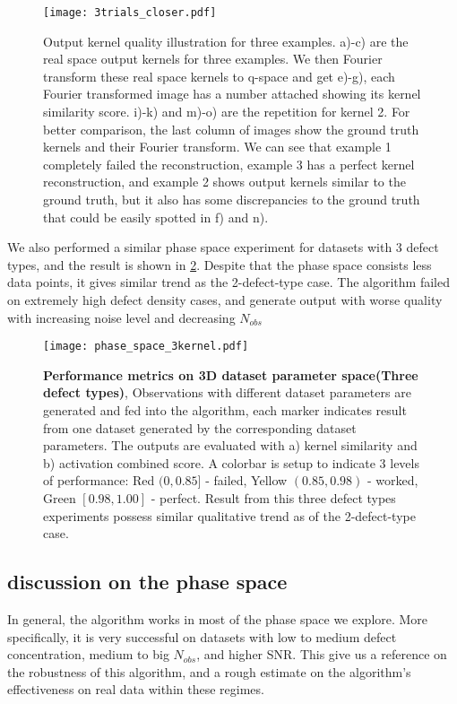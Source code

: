 \begin{figure}
	\texttt{[image: 3trials\_closer.pdf]} 
	\centering
	\caption{Output kernel quality illustration for three examples. a)-c) are the real space output kernels for three examples. We then Fourier transform these real space kernels to q-space and get e)-g), each Fourier transformed image has a number attached showing its kernel similarity score. i)-k) and m)-o) are the repetition for kernel 2. For better comparison, the last column of images show the ground truth kernels and their Fourier transform. We can see that example 1 completely failed the reconstruction, example 3 has a perfect kernel reconstruction, and example 2 shows output kernels similar to the ground truth, but it also has some discrepancies to the ground truth that could be easily spotted in f) and n).}
	\label{fig:regimes_closer}
\end{figure}

We also performed a similar phase space experiment for datasets with 3 defect types, and the result is shown in \ref{fig:phase_spaceN=3}. Despite that the phase space consists less data points, it gives similar trend as the 2-defect-type case. The algorithm failed on extremely high defect density cases, and generate output with worse quality with increasing noise level and decreasing $N_{obs}$ 

\begin{figure}
	\texttt{[image: phase\_space\_3kernel.pdf]} 
	\centering
	\caption[\textbf{Performance metrics on 3D dataset parameter space(Three defect types)}]{\textbf{Performance metrics on 3D dataset parameter space(Three defect types)}, Observations with different dataset parameters are generated and fed into the algorithm, each marker indicates result from one dataset generated by the corresponding dataset parameters. The outputs are evaluated with a) kernel similarity and b) activation combined score. A colorbar is setup to indicate 3 levels of performance: Red $(0,0.85]$ - failed, Yellow $(0.85,0.98)$ - worked, Green $[0.98,1.00]$ - perfect. Result from this three defect types experiments possess similar qualitative trend as of the 2-defect-type case.}
	\label{fig:phase_spaceN=3}
\end{figure}
\subsection{discussion on the phase space}
In general, the algorithm works in most of the phase space we explore. More specifically, it is very successful on datasets with low to medium defect concentration, medium to big $N_{obs}$, and higher SNR. This give us a reference on the robustness of this algorithm, and a rough estimate on the algorithm's effectiveness on real data within these regimes.

